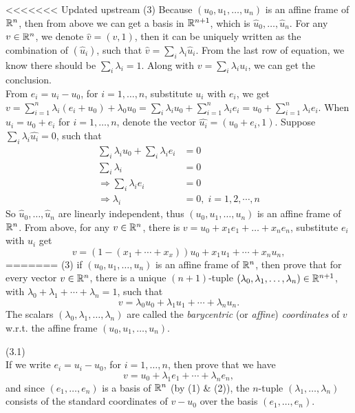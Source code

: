 \documentclass[12pt]{article}
\begin{document}
\medskip
<<<<<<< Updated upstream
(3) Because $(u_0, u_1, \ldots, u_{n })$ is an affine frame of $\mathbb{R}^n$, then from above we can get a basis in $\mathbb{R}^{n+1}$, which is $\widehat{u}_0, \ldots,  \widehat{u}_{n}$. For any $v \in \mathbb{R}^n$, we denote $\widehat{v} = (v, 1)$, then it can be uniquely written as the combination of $(\widehat{u}_i)$, such that $\widehat{v} = \sum_i \lambda_i \widehat{u}_i$. From the last row of equation, we know there should be $\sum_i \lambda_i = 1$. Along with $v = \sum_i \lambda_i u_i$, we can get the conclusion.\\
\medskip
From $e_i = u_i -  u_0$, for $i = 1, \ldots, n$, substitute $u_i$ with $e_i$, we get $v = \sum_{i=1}^n \lambda_i (e_i + u_0) + \lambda_0 u_0 = \sum_i \lambda_i u_0 + \sum_{i=1}^n \lambda_i e_i = u_0 + \sum_{i=1}^n \lambda_i e_i$.
When $u_i = u_0 + e_i$ for $i = 1, \ldots, n$, denote the vector $\widehat{u_i} = (u_0 + e_i, 1)$. Suppose $\sum_i \lambda_i \widehat{u_i} = 0$, such that
\begin{align*}
\sum_i \lambda_i u_0 + \sum_i \lambda_i e_i &= 0 \\
\sum_i \lambda_i  &= 0 \\ 
\Rightarrow \sum_i \lambda_i e_i &= 0 \\
\Rightarrow \lambda_i &= 0, \; i = 1,2, \cdots, n
\end{align*}
So $\widehat{u}_0, \ldots,  \widehat{u}_{n}$ are linearly independent, thus $(u_0, u_1, \ldots, u_n)$ is an affine frame of $\mathbb{R}^n$.
From above, for any $v\in \mathbb{R}^n$, there is $v = u_0 + x_1 e_1 + \dots + x_n e_n$, substitute $e_i$ with $u_i$ get
\[
v = (1 - (x_1 + \cdots + x_x)) u_0 + x_1 u_1 + \cdots + x_n u_n,
\]
=======
(3) if $(u_0, u_1, \ldots, u_{n })$ is an affine frame of $\mathbb{R}^n$,
then prove that for every vector $v\in \mathbb{R}^n$,  
there is a unique $(n + 1)$-tuple
$(\lambda_0, \lambda_1, \ldots, \lambda_n)\in \mathbb{R}^{n + 1}$, with
$\lambda_0 + \lambda_1 + \cdots + \lambda_n = 1$, such that
\[
v = \lambda_0 u_0 + \lambda_1 u_1 + \cdots + \lambda_n u_n.
\]
The scalars $(\lambda_0, \lambda_1, \ldots, \lambda_n)$ are called the
{\it barycentric\/} (or {\it affine\/}) {\it coordinates\/} of $v$
w.r.t. the affine frame   $(u_0, u_1, \ldots, u_{n })$.


(3.1) \\
\medskip
If we write $e_i = u_i -  u_0$, for $i = 1, \ldots, n$, then prove that
we have
\[
v = u_0 + \lambda_1 e_1 + \cdots + \lambda_n e_n,
\]
and since $(e_1, \ldots, e_n)$ is a basis of $\mathbb{R}^n$ (by (1) \&
(2)), the $n$-tuple $(\lambda_1, \ldots, \lambda_n)$ consists of the 
standard coordinates of $v - u_0$ over the basis $(e_1, \ldots, e_n)$.
\end{document}
